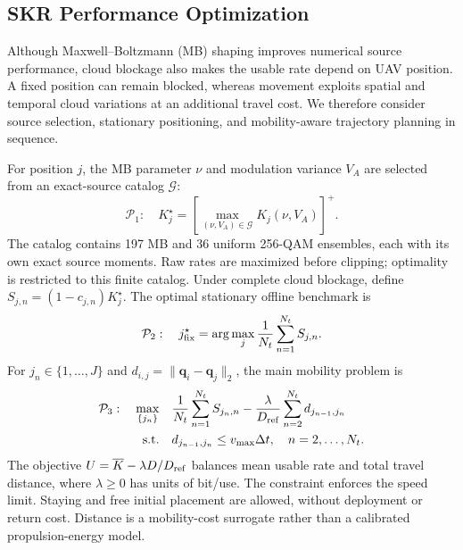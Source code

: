 \subsection{SKR Performance Optimization}
\label{sec:optimization}
\label{sec:method}
Although Maxwell--Boltzmann (MB) shaping improves numerical source
performance, cloud blockage also makes the usable rate depend on UAV
position. A fixed position can remain blocked, whereas movement exploits
spatial and temporal cloud variations at an additional travel cost.
We therefore consider source selection, stationary positioning, and
mobility-aware trajectory planning in sequence.

For position $j$, the MB parameter $\nu$ and modulation variance $V_A$
are selected from an exact-source catalog $\mathcal G$:
\begin{equation}
 \mathcal P_1:\quad K_j^\star=
 \left[\max_{(\nu,V_A)\in\mathcal G}K_j(\nu,V_A)\right]^+.
 \label{eq:p1}
\end{equation}
The catalog contains 197 MB and 36 uniform 256-QAM ensembles, each with
its own exact source moments. Raw rates are maximized before clipping;
optimality is restricted to this finite catalog. Under complete cloud
blockage, define $S_{j,n}=(1-c_{j,n})K_j^\star$. The optimal stationary
offline benchmark is
\begin{equation}
 \mathcal P_2:\quad j_{\rm fix}^\star=
 \arg\max_j\frac{1}{N_t}\sum_{n=1}^{N_t}S_{j,n}.
 \label{eq:p2}
\end{equation}
For $j_n\in\{1,\ldots,J\}$ and
$d_{i,j}=\|\mathbf q_i-\mathbf q_j\|_2$, the main mobility problem is
\begin{align}
 \mathcal P_3:\quad \max_{\{j_n\}}\quad&
 \frac{1}{N_t}\sum_{n=1}^{N_t}S_{j_n,n}
 -\frac{\lambda}{D_{\rm ref}}\sum_{n=2}^{N_t}d_{j_{n-1},j_n}
 \label{eq:p3}\\
 \mathrm{s.t.}\quad& d_{j_{n-1},j_n}\le v_{\max}\Delta t,
 \quad n=2,\ldots,N_t.\nonumber
\end{align}
The objective $U=\overline K-\lambda D/D_{\rm ref}$ balances mean usable
rate and total travel distance, where $\lambda\ge0$ has units of bit/use.
The constraint enforces the speed limit. Staying and free initial placement
are allowed, without deployment or return cost. Distance is a mobility-cost
surrogate rather than a calibrated propulsion-energy model.

